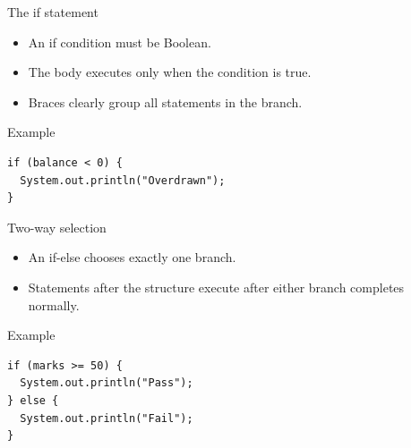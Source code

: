 \documentclass[10pt,aspectratio=169]{beamer}
\begin{document}
\begin{frame}[fragile,t]{The if statement}
\begin{itemize}
\item An if condition must be Boolean.
\item The body executes only when the condition is true.
\item Braces clearly group all statements in the branch.
\end{itemize}
\vspace{1mm}\begin{block}{Example}
\begin{lstlisting}
if (balance < 0) {
  System.out.println("Overdrawn");
}
\end{lstlisting}
\end{block}
\end{frame}

\begin{frame}[fragile,t]{Two-way selection}
\begin{itemize}
\item An if-else chooses exactly one branch.
\item Statements after the structure execute after either branch completes normally.
\end{itemize}
\vspace{1mm}\begin{block}{Example}
\begin{lstlisting}
if (marks >= 50) {
  System.out.println("Pass");
} else {
  System.out.println("Fail");
}
\end{lstlisting}
\end{block}
\end{frame}
\end{document}
